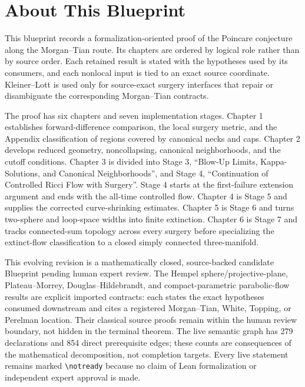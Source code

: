 

\chapter*{About This Blueprint}

This blueprint records a formalization-oriented proof of the Poincare
conjecture along the Morgan--Tian route.  Its chapters are ordered by logical
role rather than by source order.  Each retained result is stated with the
hypotheses used by its consumers, and each nonlocal input is tied to an exact
source coordinate.  Kleiner--Lott is used only for source-exact surgery
interfaces that repair or disambiguate the corresponding Morgan--Tian
contracts.

The proof has six chapters and seven implementation stages.  Chapter 1
establishes forward-difference comparison, the local surgery metric, and the
Appendix classification of regions covered by canonical necks and caps.
Chapter 2 develops reduced geometry, noncollapsing, canonical neighborhoods,
and the cutoff conditions.  Chapter 3 is divided into Stage 3, ``Blow-Up
Limits, Kappa-Solutions, and Canonical Neighborhoods'', and Stage 4,
``Continuation of Controlled Ricci Flow with Surgery''.  Stage 4 starts at the
first-failure extension argument and ends with the all-time controlled flow.
Chapter 4 is Stage 5 and supplies the corrected curve-shrinking estimates.
Chapter 5 is Stage 6 and turns two-sphere and loop-space widths into finite
extinction.  Chapter 6 is Stage 7 and tracks connected-sum topology across
every surgery before specializing the extinct-flow classification to a closed
simply connected three-manifold.

This evolving revision is a mathematically closed, source-backed candidate
Blueprint pending human expert review.  The Hempel sphere/projective-plane,
Plateau--Morrey, Douglas--Hildebrandt, and compact-parametric parabolic-flow
results are explicit imported contracts: each states the exact hypotheses
consumed downstream and cites a registered Morgan--Tian, White, Topping, or
Perelman location.  Their classical source proofs remain within the human
review boundary, not hidden in the terminal theorem.  The live semantic graph
has 279 declarations and 854 direct prerequisite edges; these counts are
consequences of the mathematical decomposition, not completion targets.  Every
live statement remains marked \verb|\notready| because no claim of Lean
formalization or independent expert approval is made.












